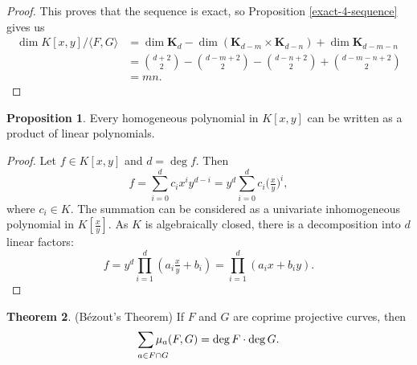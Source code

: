 \documentclass[12pt]{article}
\makeatletter
\newenvironment{fullbox}{\begin{lrbox}{\savefullbox}\begin{minipage}{\dimexpr\textwidth-2\fboxsep\relax}}{\end{minipage}\end{lrbox}\begin{center}\framebox[\textwidth]{\usebox{\savefullbox}}\end{center}}
\theoremstyle{definition}
\newtheorem{theorem}{Theorem}
\newtheorem{proposition}[theorem]{Proposition}
\newenvironment{btheorem}{\begin{fullbox}\begin{theorem}}{\end{theorem}\end{fullbox}}
\newenvironment{bproposition}{\begin{fullbox}\begin{proposition}}{\end{proposition}\end{fullbox}}
\newcommand{\<}{\langle}
\renewcommand{\>}{\rangle}
\newcommand{\longlimit}[2]{
    {
        \def\arraystretch{0}
        \begin{array}[t]{@{}l@{}}
            \displaystyle{#2} \\[8.5pt] \scriptstyle{#1}
        \end{array}
    }
}
\newcommand{\longsum}[2]{\longlimit{#1}{\sum #2}}
\newcommand{\KK}{\mathbf{K}}
\makeatother
\begin{document}
\begin{proof}
    This proves that the sequence is exact, so Proposition \ref{exact-4-sequence} gives us
    \begin{align*}
        \dim K[x, y] / \<F, G\>
            &= \dim \KK_d - \dim (\KK_{d-m} \times \KK_{d-n}) + \dim \KK_{d-m-n} \\
            &= \binom{d+2}{2} - \binom{d-m+2}{2} - \binom{d-n+2}{2} + \binom{d-m-n+2}{2} \\
            &= mn.
    \end{align*}

\end{proof}




\begin{bproposition}\label{homog-linear-factor}
    Every homogeneous polynomial in $K[x, y]$ can be written as a product of linear polynomials.
\end{bproposition}

\begin{proof}
    Let $f \in K[x, y]$ and $d = \deg f$. Then
    \[
        f
            = \sum_{i = 0}^{d} c_i x^i y^{d - i}
            = y^d \sum_{i = 0}^{d} c_i \big(\tfrac{x}{y}\big)^i,
    \]
    where $c_i \in K$. The summation can be considered as a univariate inhomogeneous polynomial in $K[\frac{x}{y}]$. As $K$ is algebraically closed, there is a decomposition into $d$ linear factors:
    \[
        f
            = y^d \prod_{i = 1}^{d} \left(a_i\tfrac{x}{y} + b_i \right)
            = \prod_{i = 1}^{d} (a_ix  + b_iy).
    \] 
\end{proof}


\begin{btheorem}(B\'ezout's Theorem)
    If $F$ and $G$ are coprime projective curves, then
    \[
        \longsum{a \in F \cap G}{\mu_a(F, G)} = \deg F \cdot \deg G.
    \]
\end{btheorem}
\end{document}
